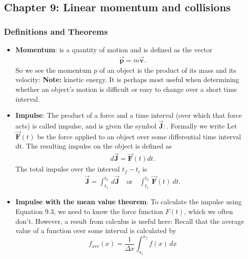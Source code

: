 \documentclass{report}
\begin{document}
    \pagebreak 
    \subsection{Chapter 9: Linear momentum and collisions}
    \bigbreak \noindent 
    \subsubsection{Definitions and Theorems}
    \begin{itemize}
        \item \textbf{Momentum}: is a quantity of motion and is defined as the vector 
            \begin{align*}
                \vec{\mathbf{p}} = m\vec{\mathbf{v}}
            .\end{align*}
            \bigbreak \noindent 
            So we see the momentum $p$ of an object is the product of its mass and its velocity:
            \bigbreak \noindent 
            \textbf{Note:} kinetic energy. It is perhaps most useful when determining whether an object’s motion is difficult or easy to change over a short time interval.
        \item \textbf{Impulse}: The product of a force and a time interval (over which that force acts) is called impulse, and is given the symbol  $\vec{\mathbf{J}}:$. Formally we write
            \bigbreak \noindent 
            Let  $\vec{\mathbf{F}}(t)$
            be the force applied to an object over some differential time interval dt. The resulting impulse on the object is defined as
            \begin{align*}
                d\vec{\mathbf{J}} = \vec{\mathbf{F}}(t)dt
            .\end{align*}
            \bigbreak \noindent 
            The total impulse over the interval $t_{f} - t_{i}$ is
            \begin{align*}
                \vec{\mathbf{J}} = \int_{t_{1}}^{t_{2}}\ d\vec{\mathbf{J}} \quad \text{or} \quad \int_{t_{1}}^{t_{2}}\ \vec{\mathbf{F}}(t)\ dt
            .\end{align*}
        \item \textbf{Impulse with the mean value theorem}:
            To calculate the impulse using Equation 9.3, we need to know the force function $F(t)$, which we often don’t. However, a result from calculus is useful here: Recall that the average value of a function over some interval is calculated by
            \[
                f_{\text{ave}}(x) = \frac{1}{\Delta x} \int_{x_i}^{x_f} f(x) \, dx
\]
\end{itemize}
\end{document}
